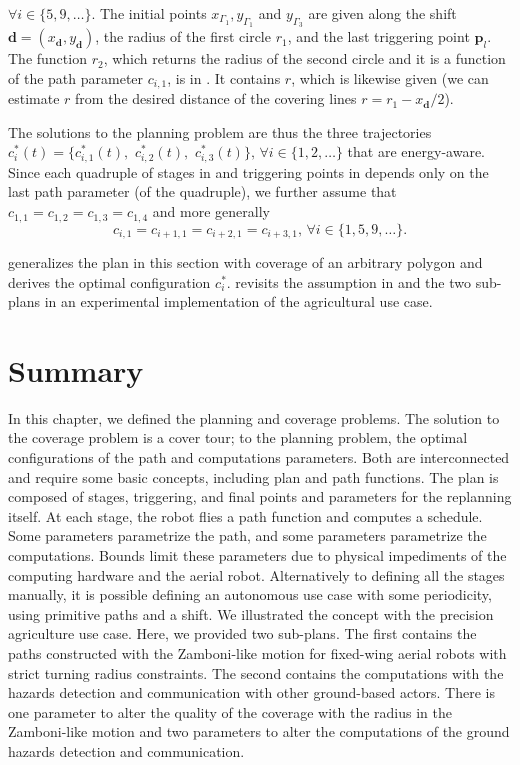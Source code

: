 $\forall i\in\{5,9,\dots\}$. The initial points $x_{\Gamma_1},y_{\Gamma_1}$ and $y_{\Gamma_3}$ are given along the shift $\mathbf{d}=(x_\mathbf{d},y_\mathbf{d})$, the radius of the first circle $r_1$, and the last triggering point $\mathbf{p}_l$. The function $r_2$, which returns the radius of the second circle and it is a function of the path parameter $c_{i,1}$, is in . It contains $r$, which is likewise given (we can estimate $r$ from the desired distance of the covering lines $r=r_1-x_\mathbf{d}/2$).

The solutions to the planning problem are thus the three trajectories $c_i^*(t)=\{c_{i,1}^*(t),$ $c_{i,2}^*(t),$ $c_{i,3}^*(t)\},\,\forall i\in\{1,2,\dots\}$ that are energy-aware. 
Since each quadruple of stages in  and triggering points in  depends only on the last path parameter (of the quadruple), we further assume that $c_{1,1}=c_{1,2}=c_{1,3}=c_{1,4}$ and more generally 
\begin{equation}\label{eq:very-last-assmp}
c_{i,1}=c_{i+1,1}=c_{i+2,1}=c_{i+3,1},\,\forall i\in\{1,5,9,\dots\}.
\end{equation}

 generalizes the plan in this section with coverage of an arbitrary polygon and derives the optimal configuration $c_i^*$.  revisits the assumption in  and the two sub-plans in an experimental implementation of the agricultural use case.


\section{Summary}

In this chapter, we defined the planning and coverage problems. The solution to the coverage problem is a cover tour; to the planning problem, the optimal configurations of the path and computations parameters. Both are interconnected and require some basic concepts, including plan and path functions. The plan is composed of stages, triggering, and final points and parameters for the replanning itself. At each stage, the robot flies a path function and computes a schedule. Some parameters parametrize the path, and some parameters parametrize the computations. Bounds limit these parameters due to physical impediments of the computing hardware and the aerial robot. Alternatively to defining all the stages manually, it is possible defining an autonomous use case with some periodicity, using primitive paths and a shift. We illustrated the concept with the precision agriculture use case. Here, we provided two sub-plans. The first contains the paths constructed with the Zamboni-like motion for fixed-wing aerial robots with strict turning radius constraints. The second contains the computations with the hazards detection and communication with other ground-based actors. There is one parameter to alter the quality of the coverage with the radius in the Zamboni-like motion and two parameters to alter the computations of the ground hazards detection and communication.


